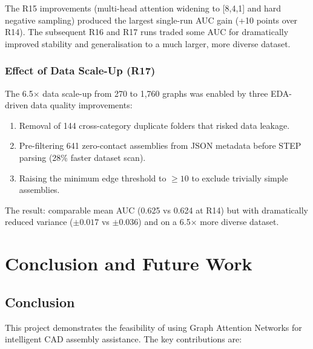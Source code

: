 \documentclass[12pt]{report}
\begin{document}
The R15 improvements (multi-head attention widening to [8,4,1] and hard negative sampling) produced the largest single-run AUC gain (+10 points over R14). The subsequent R16 and R17 runs traded some AUC for dramatically improved stability and generalisation to a much larger, more diverse dataset.

\subsection{Effect of Data Scale-Up (R17)}

The 6.5$\times$ data scale-up from 270 to 1,760 graphs was enabled by three EDA-driven data quality improvements:
\begin{enumerate}
    \item Removal of 144 cross-category duplicate folders that risked data leakage.
    \item Pre-filtering 641 zero-contact assemblies from JSON metadata before STEP parsing (28\% faster dataset scan).
    \item Raising the minimum edge threshold to $\geq 10$ to exclude trivially simple assemblies.
\end{enumerate}

The result: comparable mean AUC (0.625 vs 0.624 at R14) but with dramatically reduced variance ($\pm 0.017$ vs $\pm 0.036$) and on a 6.5$\times$ more diverse dataset.

\newpage

\chapter{Conclusion and Future Work}

\section{Conclusion}

This project demonstrates the feasibility of using Graph Attention Networks for intelligent CAD assembly assistance. The key contributions are:
\end{document}
